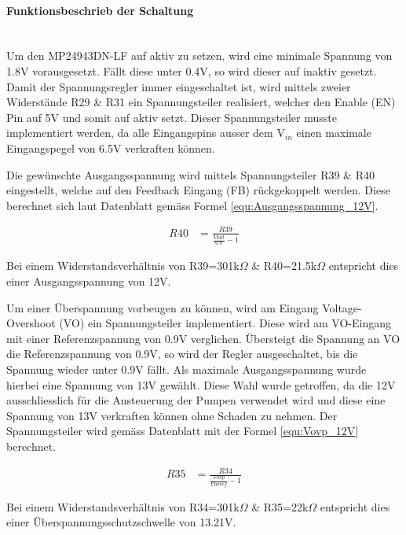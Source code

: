 \paragraph{Funktionsbeschrieb der Schaltung}\mbox{}\\

Um den MP24943DN-LF auf aktiv zu setzen, wird eine minimale Spannung von 1.8V vorausgesetzt. Fällt diese unter 0.4V, so wird dieser auf inaktiv gesetzt. Damit der Spannungsregler immer eingeschaltet ist, wird mittels zweier Widerstände R29 \& R31 ein Spannungsteiler realisiert, welcher den Enable (EN) Pin auf 5V und somit auf aktiv setzt. Dieser Spannungsteiler musste implementiert werden, da alle Eingangspins ausser dem V$_{in}$ einen maximale Eingangspegel von 6.5V verkraften können.\cite[S.3]{monolithic_power_systems_mp24943_2011} 

Die gewünschte Ausgangsspannung wird mittels Spannungsteiler R39 \& R40 eingestellt, welche auf den Feedback Eingang (FB) rückgekoppelt werden. Diese berechnet sich laut Datenblatt gemäss Formel \ref{equ:Ausgangsspannung_12V}. \cite[S.10]{monolithic_power_systems_mp24943_2011}

\begin{align}
R40 &= \frac{R39}{\frac{Vout}{0.8}-1}
\label{equ:Ausgangsspannung_12V}
\end{align}

Bei einem Widerstandsverhältnis von R39=301k$\Omega$ \& R40=21.5k$\Omega$ entspricht dies einer Ausgangsspannung von 12V. \cite[S.10]{monolithic_power_systems_mp24943_2011}

Um einer Überspannung vorbeugen zu können, wird am Eingang Voltage-Overshoot (VO) ein Spannungsteiler implementiert. Diese wird am VO-Eingang mit einer Referenzspannung von 0.9V verglichen. Übersteigt die Spannung an VO die Referenzspannung von 0.9V, so wird der Regler ausgeschaltet, bis die Spannung wieder unter 0.9V fällt. Als maximale Ausgangsspannung wurde hierbei eine Spannung von 13V gewählt. Diese Wahl wurde getroffen, da die 12V ausschliesslich für die Ansteuerung der Pumpen verwendet wird und diese eine Spannung von 13V verkraften können ohne Schaden zu nehmen. Der Spannungsteiler wird gemäss Datenblatt mit der Formel \ref{equ:Vovp_12V} berechnet. \cite[S.10]{monolithic_power_systems_mp24943_2011}

\begin{align}
R35 &= \frac{R34}{\frac{Vovp}{Vovref}-1}
\label{equ:Vovp_12V}
\end{align}

Bei einem Widerstandsverhältnis von R34=301k$\Omega$ \& R35=22k$\Omega$ entspricht dies einer Überspannungsschutzschwelle von 13.21V. \cite{mouser_mp24943dn-lf_nodate} \cite[S.10]{monolithic_power_systems_mp24943_2011}

